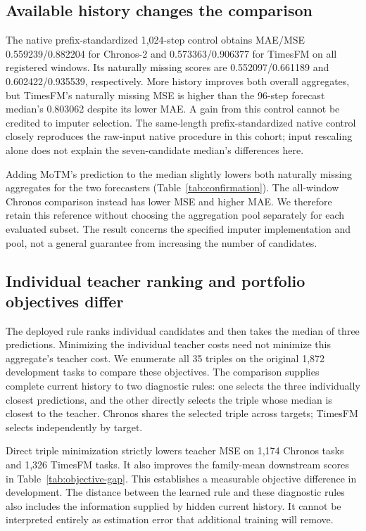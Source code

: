 \documentclass{article}
\begin{document}
\subsection{Available history changes the comparison}

The native prefix-standardized 1,024-step control obtains MAE/MSE 0.559239/0.882204 for Chronos-2 and 0.573363/0.906377 for TimesFM on all registered windows. Its naturally missing scores are 0.552097/0.661189 and 0.602422/0.935539, respectively. More history improves both overall aggregates, but TimesFM's naturally missing MSE is higher than the 96-step forecast median's 0.803062 despite its lower MAE. A gain from this control cannot be credited to imputer selection. The same-length prefix-standardized native control closely reproduces the raw-input native procedure in this cohort; input rescaling alone does not explain the seven-candidate median's differences here.

Adding MoTM's prediction to the median slightly lowers both naturally missing aggregates for the two forecasters (Table~\ref{tab:confirmation}). The all-window Chronos comparison instead has lower MSE and higher MAE. We therefore retain this reference without choosing the aggregation pool separately for each evaluated subset. The result concerns the specified imputer implementation and pool, not a general guarantee from increasing the number of candidates.

\subsection{Individual teacher ranking and portfolio objectives differ}

The deployed rule ranks individual candidates and then takes the median of three predictions. Minimizing the individual teacher costs need not minimize this aggregate's teacher cost. We enumerate all 35 triples on the original 1,872 development tasks to compare these objectives. The comparison supplies complete current history to two diagnostic rules: one selects the three individually closest predictions, and the other directly selects the triple whose median is closest to the teacher. Chronos shares the selected triple across targets; TimesFM selects independently by target.

Direct triple minimization strictly lowers teacher MSE on 1,174 Chronos tasks and 1,326 TimesFM tasks. It also improves the family-mean downstream scores in Table~\ref{tab:objective-gap}. This establishes a measurable objective difference in development. The distance between the learned rule and these diagnostic rules also includes the information supplied by hidden current history. It cannot be interpreted entirely as estimation error that additional training will remove.
\end{document}
